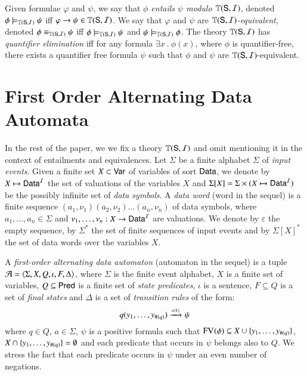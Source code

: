 \documentclass{llncs}
\begin{document}
Given formulae $\varphi$ and $\psi$, we say that \emph{$\phi$ entails
  $\psi$ modulo $\mathbb{T}(\mathsf{S},\mathcal{I})$}, denoted $\phi
\models_{\mathbb{T}(\mathsf{S},\mathcal{I})} \psi$ iff $\varphi \rightarrow \psi \in
\mathbb{T}(\mathsf{S},\mathcal{I})$. We say that $\varphi$ and $\psi$ are
\emph{$\mathbb{T}(\mathsf{S},\mathcal{I})$-equivalent}, denoted $\phi
\equiv_{\mathbb{T}(\mathsf{S},\mathcal{I})} \psi$ iff $\phi \models_{\mathbb{T}(\mathsf{S},\mathcal{I})}
\psi$ and $\psi \models_{\mathbb{T}(\mathsf{S},\mathcal{I})} \phi$. The theory
$\mathbb{T}(\mathsf{S},\mathcal{I})$ has \emph{quantifier elimination} iff for any
formula $\exists x ~.~ \phi(x)$, where $\phi$ is quantifier-free,
there exists a quantifier free formula $\psi$ such that $\phi$ and
$\psi$ are $\mathbb{T}(\mathsf{S},\mathcal{I})$-equivalent.

\section{First Order Alternating Data Automata}

In the rest of the paper, we we fix a theory $\mathbb{T}(\mathsf{S},\mathcal{I})$ and
omit mentioning it in the context of entailments and equivalences. Let
$\Sigma$ be a finite alphabet $\Sigma$ of \emph{input events}. Given a
finite set $X \subset \mathsf{Var}$ of variables of sort $\mathsf{Data}$, we denote
by $X \mapsto \mathsf{Data}^{\mathcal{I}}$ the set of valuations of the variables $X$ and
$\Sigma[X] = \Sigma \times (X \mapsto \mathsf{Data}^{\mathcal{I}})$ be the possibly
infinite set of \emph{data symbols}. A \emph{data word} (word in the
sequel) is a finite sequence $(a_1,\nu_1)(a_2,\nu_2) \ldots
(a_n,\nu_n)$ of data symbols, where $a_1,\ldots,a_n \in \Sigma$ and
$\nu_1,\ldots,\nu_n : X \rightarrow \mathsf{Data}^{\mathcal{I}}$ are valuations. We
denote by $\varepsilon$ the empty sequence, by $\Sigma^*$ the set of
finite sequences of input events and by $\Sigma[X]^*$ the set of data
words over the variables $X$.

A \emph{first-order alternating data automaton} (automaton in the
sequel) is a tuple $\mathcal{A} = \langle \Sigma,X,Q,\iota,F,\Delta \rangle$, where
$\Sigma$ is the finite event alphabet, $X$ is a
finite set of variables, $Q \subseteq \mathsf{Pred}$ is a finite set of
\emph{state predicates}, $\iota$ is a sentence, $F \subseteq Q$ is a
set of \emph{final states} and $\Delta$ is a set of \emph{transition
  rules} of the form:
\[q(y_1,\ldots,y_{\#(q)}) \xrightarrow{{\scriptscriptstyle a(X)}}_{{\scriptstyle }} \psi\]
where $q \in Q$, $a \in \Sigma$, $\psi$ is a positive formula such
that $\mathrm{FV}_{}(\phi) \subseteq X \cup \{ y_1,\ldots,y_{\#(q)} \}$, $X
\cap \{ y_1,\ldots,y_{\#(q)} \} = \emptyset$ and each predicate that
occurs in $\psi$ belongs also to $Q$. We stress the fact that each
predicate occurs in $\psi$ under an even number of negations.
\end{document}
